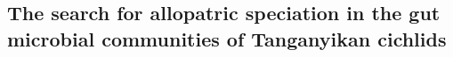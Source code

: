 \begin{refsection}

\chapter{The search for allopatric speciation in the gut microbial communities of Tanganyikan cichlids}







\printbibliography[heading=subbibliography]

\end{refsection}